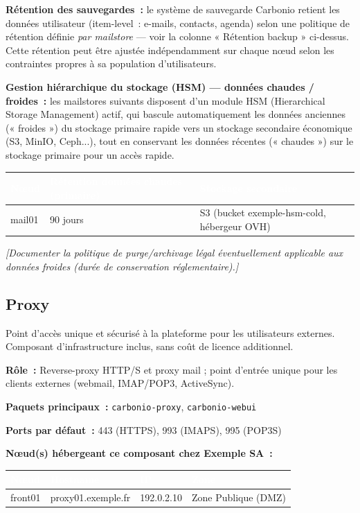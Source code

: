 \documentclass[11pt,a4paper]{report}
\newcommand{\placeholder}[1]{\textit{\textcolor{placeholdercol}{[#1]}}\par\vspace{4pt}}
\newcommand{\tblhead}[1]{\textcolor{white}{\textbf{#1}}}
\begin{document}
\textbf{Rétention des sauvegardes~:} le système de sauvegarde Carbonio retient les données utilisateur (item-level~: e-mails, contacts, agenda) selon une politique de rétention définie \emph{par mailstore} --- voir la colonne « Rétention backup » ci-dessus. Cette rétention peut être ajustée indépendamment sur chaque nœud selon les contraintes propres à sa population d'utilisateurs.

\textbf{Gestion hiérarchique du stockage (HSM) --- données chaudes / froides~:} les mailstores suivants disposent d'un module HSM (Hierarchical Storage Management) actif, qui bascule automatiquement les données anciennes (« froides ») du stockage primaire rapide vers un stockage secondaire économique (S3, MinIO, Ceph...), tout en conservant les données récentes (« chaudes ») sur le stockage primaire pour un accès rapide.
\begin{longtable}{|p{4cm}|p{4cm}|p{5cm}|}
\hline
\rowcolor{primary}\tblhead{Nœud} & \tblhead{Rétention données chaudes (primaire)} & \tblhead{Stockage secondaire} \\
\hline
\endhead
mail01 & 90 jours & S3 (bucket exemple-\allowbreak{}hsm-\allowbreak{}cold, hébergeur OVH) \\
\hline
\end{longtable}
\placeholder{Documenter la politique de purge/archivage légal éventuellement applicable aux données froides (durée de conservation réglementaire).}


\subsection{Proxy}

Point d'accès unique et sécurisé à la plateforme pour les utilisateurs externes.\allowbreak{} Composant d'infrastructure inclus, sans coût de licence additionnel.\allowbreak{}

\textbf{Rôle~:} Reverse-\allowbreak{}proxy HTTP/S et proxy mail ; point d'entrée unique pour les clients externes (webmail, IMAP/POP3, ActiveSync).\allowbreak{}

\textbf{Paquets principaux~:} \texttt{carbonio-\allowbreak{}proxy}, \texttt{carbonio-\allowbreak{}webui}

\textbf{Ports par défaut~:} 443 (HTTPS), 993 (IMAPS), 995 (POP3S)

\textbf{Nœud(s) hébergeant ce composant chez Exemple SA~:}
\begin{longtable}{|p{3.2cm}|p{4.5cm}|p{3.2cm}|p{2.3cm}|}
\hline
\rowcolor{primary}\tblhead{Nœud} & \tblhead{Hostname} & \tblhead{IP} & \tblhead{Zone} \\
\hline
\endhead
front01 & proxy01.\allowbreak{}exemple.\allowbreak{}fr & 192.\allowbreak{}0.\allowbreak{}2.\allowbreak{}10 & Zone Publique (DMZ) \\
\hline
\end{longtable}
\end{document}
